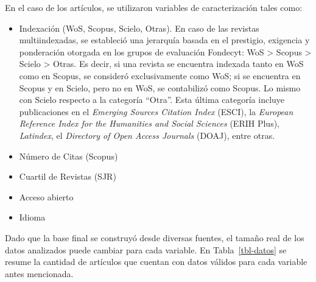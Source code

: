 \documentclass[
  spanish,
  a4paper,
  oneside]{scrbook}
\begin{document}
En el caso de los artículos, se utilizaron variables de caracterización
tales como:

\begin{itemize}
\item
  Indexación (WoS, Scopus, Scielo, Otras). En caso de las revistas
  multiindexadas, se estableció una jerarquía basada en el prestigio,
  exigencia y ponderación otorgada en los grupos de evaluación Fondecyt:
  WoS \textgreater{} Scopus \textgreater{} Scielo \textgreater{} Otras.
  Es decir, si una revista se encuentra indexada tanto en WoS como en
  Scopus, se consideró exclusivamente como WoS; si se encuentra en
  Scopus y en Scielo, pero no en WoS, se contabilizó como Scopus. Lo
  mismo con Scielo respecto a la categoría ``Otra''. Esta última
  categoría incluye publicaciones en el \emph{Emerging Sources Citation
  Index} (ESCI), la \emph{European Reference Index for the Humanities
  and Social Sciences} (ERIH Plus), \emph{Latindex}, el \emph{Directory
  of Open Access Journals} (DOAJ), entre otras.
\item
  Número de Citas (Scopus)
\item
  Cuartil de Revistas (SJR)
\item
  Acceso abierto
\item
  Idioma
\end{itemize}

Dado que la base final se construyó desde diversas fuentes, el tamaño
real de los datos analizados puede cambiar para cada variable. En
Tabla~\ref{tbl-datos} se resume la cantidad de artículos que cuentan con
datos válidos para cada variable antes mencionada.

\begin{table}

\caption{\label{tbl-datos}N analítico por variable de análisis}


\end{table}%
\end{document}
